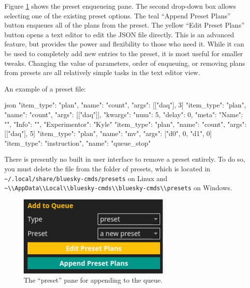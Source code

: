 Figure \ref{acq:fig:preset} shows the preset enqueueing pane.
The second drop-down box allows selecting one of the existing preset options.
The teal ``Append Preset Plans'' button enqueues all of the plans from the preset.
The yellow ``Edit Preset Plans'' button opens a text editor to edit the JSON file directly.
This is an advanced feature, but provides the power and flexibility to those who need it.
While it can be used to completely add new entries to the preset, it is most useful for smaller tweaks.
Changing the value of parameters, order of enqueuing, or removing plans from presets are all relatively simple tasks in the text editor view.

An example of a preset file:

\begin{codefragment}{json}
\noop
{"item_type": "plan", "name": "count", "args": [["daq"], 3]}
{"item_type": "plan", "name": "count", "args": [["daq"]], "kwargs": {"num": 5, "delay": 0}, "meta": {"Name": "", "Info": "", "Experimentor": "Kyle"}}
{"item_type": "plan", "name": "count", "args": [["daq"], 5]}
{"item_type": "plan", "name": "mv", "args": ["d0", 0, "d1", 0]}
{"item_type": "instruction", "name": "queue_stop"}

\end{codefragment}

There is presently no built in user interface to remove a preset entirely.
To do so, you must delete the file from the folder of presets, which is located in \nolinkurl{~/.local/share/bluesky-cmds/presets} on Linux and \nolinkurl{\~\\AppData\\Local\\bluesky-cmds\\bluesky-cmds\\presets} on Windows.


\begin{figure}
\includegraphics[width=3in]{"acquisition/images/preset"}
\caption[Preset Pane]{
	The ``preset'' pane for appending to the queue.
}
\label{acq:fig:preset}
\end{figure}

